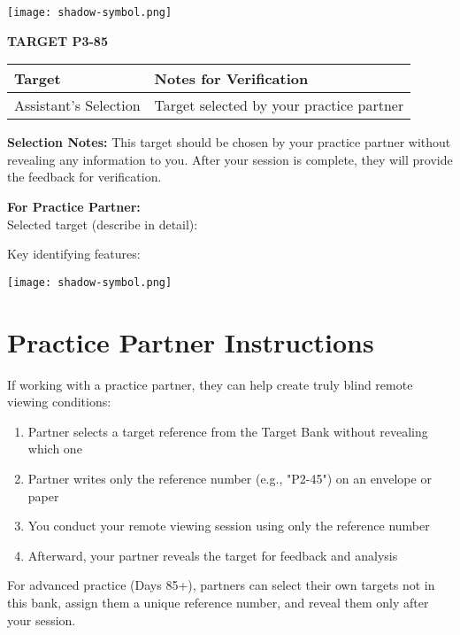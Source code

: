 \documentclass[10pt,twoside,final]{book} %
\makeatletter
\newcommand{\cleardoublepageWithSymbol}{%
  \clearpage %
  \if@twoside %
    \ifodd\c@page %
    \else %
      \thispagestyle{fancy} %
      \begingroup %
        \vspace*{0pt} %
        \vfill %
        \centering %
        \noindent 
        \texttt{[image: shadow-symbol.png]}
        \vfill %
      \endgroup
      \newpage    %
      \if@twocolumn\if@firstcolumn\else\hbox{}\newpage\fi\fi
    \fi
  \fi
}
\makeatother
\begin{document}
\cleardoublepageWithSymbol

\label{target:P3-85}
\begin{center}
\Large\textbf{TARGET P3-85}
\end{center}
\begin{mdframed}[backgroundcolor=white, linewidth=0.7pt, linecolor=rvprimary, shadow=true, shadowsize=1pt, shadowcolor=graydark!40, roundcorner=3pt]
\begin{tabular}{|p{3.5cm}|p{9cm}|}
\hline
\rowcolor{rvprimary!15}
\textbf{Target} & \textbf{Notes for Verification} \\
\hline
Assistant's Selection & Target selected by your practice partner \\
\hline
\end{tabular}

\vspace{0.3cm}
\textbf{Selection Notes:} This target should be chosen by your practice partner without revealing any information to you. After your session is complete, they will provide the feedback for verification.

\vspace{0.2cm}
\textbf{For Practice Partner:}\\
Selected target (describe in detail): \rule{0pt}{1in}


\vspace{0.2cm}
Key identifying features:\\
\rule{0pt}{1in}
\end{mdframed}
\cleardoublepageWithSymbol


\section*{Practice Partner Instructions}
\begin{mdframed}[backgroundcolor=rvlight, linewidth=0.7pt, linecolor=rvprimary, shadow=true, shadowsize=1pt, shadowcolor=graydark!40, roundcorner=3pt]
If working with a practice partner, they can help create truly blind remote viewing conditions:

\begin{enumerate}
\item Partner selects a target reference from the Target Bank without revealing which one
\item Partner writes only the reference number (e.g., "P2-45") on an envelope or paper
\item You conduct your remote viewing session using only the reference number
\item Afterward, your partner reveals the target for feedback and analysis
\end{enumerate}

For advanced practice (Days 85+), partners can select their own targets not in this bank, assign them a unique reference number, and reveal them only after your session.
\end{mdframed}
\end{document}
